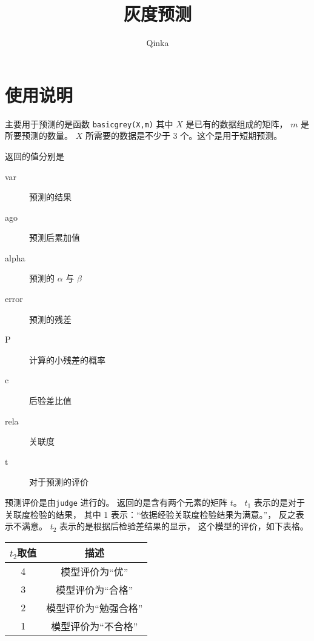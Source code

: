 \documentclass{ctexart}
\author{Qinka}
\title{灰度预测}
\begin{document}
  \maketitle
  \section{使用说明}
  \label{sec:note}
  主要用于预测的是函数 \lstinline|basicgrey(X,m)|
  其中 $X$ 是已有的数据组成的矩阵， $m$ 是所要预测的数量。
  $X$ 所需要的数据是不少于 3 个。这个是用于短期预测。
  
  返回的值分别是
  \begin{description}
      \item[var] 预测的结果
      \item[ago] 预测后累加值
      \item[alpha] 预测的 $\alpha$ 与 $\beta$
      \item[error] 预测的残差
      \item[P] 计算的小残差的概率
      \item[c] 后验差比值
      \item[rela] 关联度
      \item[t] 对于预测的评价
  \end{description}
    
  预测评价是由\lstinline|judge| 进行的。
  返回的是含有两个元素的矩阵 $t$。
  $t_1$ 表示的是对于关联度检验的结果，
  其中 1 表示：“依据经验关联度检验结果为满意。”，
  反之表示不满意。
  $t_2$ 表示的是根据后检验差结果的显示，
  这个模型的评价，如下表格。
  \begin{center}
  \begin{tabular}{c|c}
       \hline
       $t_2$取值 & 描述 \\
       \hline
       4 & 模型评价为“优” \\ 
       3 & 模型评价为“合格” \\ 
       2 & 模型评价为“勉强合格” \\ 
       1 & 模型评价为“不合格” \\ 
       \hline 
  \end{tabular} 
  \end{center}
\end{document}
